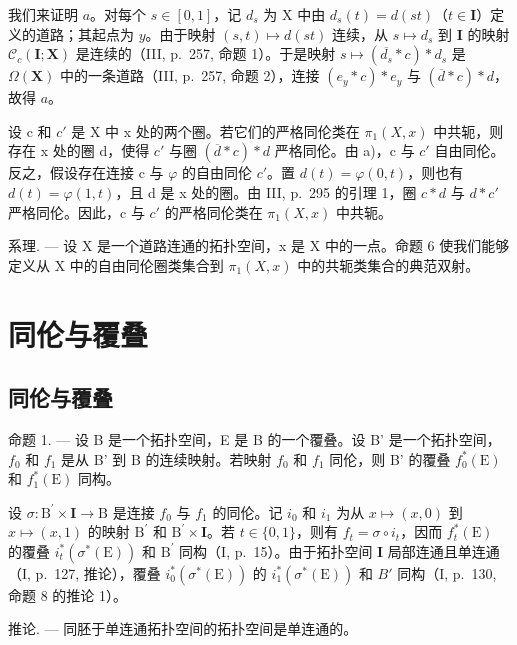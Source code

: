 我们来证明 \(a\)。对每个 \(s \in [0,1]\)，记 \(d_s\) 为 X 中由 \(d_s(t) = d(st)\)（\(t \in \mathbf{I}\)）定义的道路；其起点为 \(y\)。由于映射 \((s,t) \mapsto d(st)\) 连续，从 \(s \mapsto d_s\) 到 \(\mathbf{I}\) 的映射 \(\mathcal{C}_c(\mathbf{I};\mathbf{X})\) 是连续的（III, p.~257, 命题 1）。于是映射 \(s \mapsto (\overline{d_s} * c) * d_s\) 是 \(\Omega(\mathbf{X})\) 中的一条道路（III, p.~257, 命题 2），连接 \((e_y * c) * e_y\) 与 \((\overline{d} * c) * d\)，故得 \(a\)。

设 c 和 \(c'\) 是 X 中 x 处的两个圈。若它们的严格同伦类在 \(\pi_{1}(X,x)\) 中共轭，则存在 x 处的圈 d，使得 \(c'\) 与圈 \((\overline{d} * c) * d\) 严格同伦。由 a)，c 与 \(c'\) 自由同伦。反之，假设存在连接 c 与 \(\varphi\) 的自由同伦 \(c'\)。置 \(d(t) = \varphi(0,t)\)，则也有 \(d(t) = \varphi(1,t)\)，且 d 是 x 处的圈。由 III, p.~295 的引理 1，圈 \(c * d\) 与 \(d * c'\) 严格同伦。因此，c 与 \(c'\) 的严格同伦类在 \(\pi_{1}(X,x)\) 中共轭。

系理. --- 设 X 是一个道路连通的拓扑空间，x 是 X 中的一点。命题 6 使我们能够定义从 X 中的自由同伦圈类集合到 \(\pi_{1}(X,x)\) 中的共轭类集合的典范双射。

\section{同伦与覆叠}

\subsection{同伦与覆叠}

命题 1. --- 设 B 是一个拓扑空间，E 是 B 的一个覆叠。设 B' 是一个拓扑空间，\(f_0\) 和 \(f_1\) 是从 B' 到 B 的连续映射。若映射 \(f_0\) 和 \(f_1\) 同伦，则 B' 的覆叠 \(f_0^*(\mathrm{E})\) 和 \(f_1^*(\mathrm{E})\) 同构。

设 \(\sigma\colon\mathrm{B}^{\prime}\times\mathbf{I}\to\mathrm{B}\) 是连接 \(f_{0}\) 与 \(f_{1}\) 的同伦。记 \(i_{0}\) 和 \(i_{1}\) 为从 \(x\mapsto(x,0)\) 到 \(x\mapsto(x,1)\) 的映射 \(\mathrm{B}^{\prime}\) 和 \(\mathrm{B}^{\prime}\times\mathbf{I}\)。若 \(t\in\{0,1\}\)，则有 \(f_{t}=\sigma\circ i_{t}\)，因而 \(f_{t}^{*}(\mathrm{E})\) 的覆叠 \(i_{t}^{*}(\sigma^{*}(\mathrm{E}))\) 和 \(\mathrm{B}^{\prime}\) 同构（I, p.~15）。由于拓扑空间 \(\mathbf{I}\) 局部连通且单连通（I, p.~127, 推论），覆叠 \(i_{0}^{*}(\sigma^{*}(\mathrm{E}))\) 的 \(i_{1}^{*}(\sigma^{*}(\mathrm{E}))\) 和 \(B'\) 同构（I, p.~130, 命题 8 的推论 1）。

推论. --- 同胚于单连通拓扑空间的拓扑空间是单连通的。

